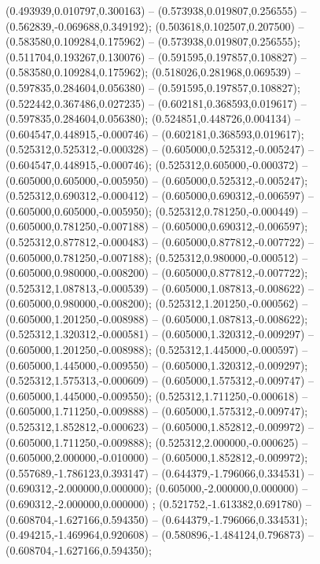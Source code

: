  (0.493939,0.010797,0.300163) -- (0.573938,0.019807,0.256555) -- (0.562839,-0.069688,0.349192);
 (0.503618,0.102507,0.207500) -- (0.583580,0.109284,0.175962) -- (0.573938,0.019807,0.256555);
 (0.511704,0.193267,0.130076) -- (0.591595,0.197857,0.108827) -- (0.583580,0.109284,0.175962);
 (0.518026,0.281968,0.069539) -- (0.597835,0.284604,0.056380) -- (0.591595,0.197857,0.108827);
 (0.522442,0.367486,0.027235) -- (0.602181,0.368593,0.019617) -- (0.597835,0.284604,0.056380);
 (0.524851,0.448726,0.004134) -- (0.604547,0.448915,-0.000746) -- (0.602181,0.368593,0.019617);
 (0.525312,0.525312,-0.000328) -- (0.605000,0.525312,-0.005247) -- (0.604547,0.448915,-0.000746);
 (0.525312,0.605000,-0.000372) -- (0.605000,0.605000,-0.005950) -- (0.605000,0.525312,-0.005247);
 (0.525312,0.690312,-0.000412) -- (0.605000,0.690312,-0.006597) -- (0.605000,0.605000,-0.005950);
 (0.525312,0.781250,-0.000449) -- (0.605000,0.781250,-0.007188) -- (0.605000,0.690312,-0.006597);
 (0.525312,0.877812,-0.000483) -- (0.605000,0.877812,-0.007722) -- (0.605000,0.781250,-0.007188);
 (0.525312,0.980000,-0.000512) -- (0.605000,0.980000,-0.008200) -- (0.605000,0.877812,-0.007722);
 (0.525312,1.087813,-0.000539) -- (0.605000,1.087813,-0.008622) -- (0.605000,0.980000,-0.008200);
 (0.525312,1.201250,-0.000562) -- (0.605000,1.201250,-0.008988) -- (0.605000,1.087813,-0.008622);
 (0.525312,1.320312,-0.000581) -- (0.605000,1.320312,-0.009297) -- (0.605000,1.201250,-0.008988);
 (0.525312,1.445000,-0.000597) -- (0.605000,1.445000,-0.009550) -- (0.605000,1.320312,-0.009297);
 (0.525312,1.575313,-0.000609) -- (0.605000,1.575312,-0.009747) -- (0.605000,1.445000,-0.009550);
 (0.525312,1.711250,-0.000618) -- (0.605000,1.711250,-0.009888) -- (0.605000,1.575312,-0.009747);
 (0.525312,1.852812,-0.000623) -- (0.605000,1.852812,-0.009972) -- (0.605000,1.711250,-0.009888);
 (0.525312,2.000000,-0.000625) -- (0.605000,2.000000,-0.010000) -- (0.605000,1.852812,-0.009972);
 (0.557689,-1.786123,0.393147) -- (0.644379,-1.796066,0.334531) -- (0.690312,-2.000000,0.000000);
 (0.605000,-2.000000,0.000000) -- (0.690312,-2.000000,0.000000) ;
 (0.521752,-1.613382,0.691780) -- (0.608704,-1.627166,0.594350) -- (0.644379,-1.796066,0.334531);
 (0.494215,-1.469964,0.920608) -- (0.580896,-1.484124,0.796873) -- (0.608704,-1.627166,0.594350);
